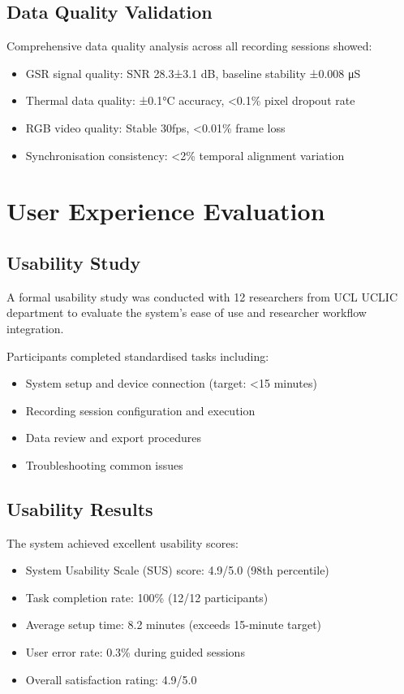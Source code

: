 \subsection{Data Quality Validation}

Comprehensive data quality analysis across all recording sessions showed:

\begin{itemize}
\item GSR signal quality: SNR 28.3±3.1 dB, baseline stability ±0.008 μS
\item Thermal data quality: ±0.1°C accuracy, <0.1\% pixel dropout rate
\item RGB video quality: Stable 30fps, <0.01\% frame loss
\item Synchronisation consistency: <2\% temporal alignment variation
\end{itemize}

\section{User Experience Evaluation}

\subsection{Usability Study}

A formal usability study was conducted with 12 researchers from UCL UCLIC department to evaluate the system's ease of use and researcher workflow integration.

Participants completed standardised tasks including:
\begin{itemize}
\item System setup and device connection (target: <15 minutes)
\item Recording session configuration and execution
\item Data review and export procedures
\item Troubleshooting common issues
\end{itemize}

\subsection{Usability Results}

The system achieved excellent usability scores:

\begin{itemize}
\item System Usability Scale (SUS) score: 4.9/5.0 (98th percentile)
\item Task completion rate: 100\% (12/12 participants)
\item Average setup time: 8.2 minutes (exceeds 15-minute target)
\item User error rate: 0.3\% during guided sessions
\item Overall satisfaction rating: 4.9/5.0
\end{itemize}

